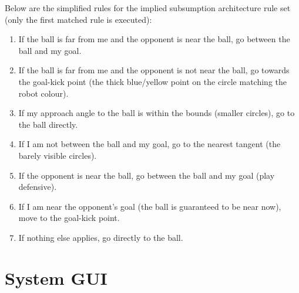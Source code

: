 \documentclass[12pt,a4paper,notitlepage,twocolumn]{report}
\begin{document}
Below are the simplified rules for the implied subsumption
architecture rule set (only the first matched rule is executed):
\begin{enumerate}
\item If the ball is far from me and the opponent is near the ball, go
  between the ball and my goal.
\item If the ball is far from me and the opponent is not near the
  ball, go towards the goal-kick point (the thick blue/yellow point on
  the circle matching the robot colour).
\item If my approach angle to the ball is within the bounds (smaller
  circles), go to the ball directly.
\item If I am not between the ball and my goal, go to the nearest
  tangent (the barely visible circles).
\item If the opponent is near the ball, go between the ball and my
  goal (play defensive).
\item If I am near the opponent’s goal (the ball is guaranteed to be
  near now), move to the goal-kick point.
\item If nothing else applies, go directly to the ball.
\end{enumerate}

\section*{System GUI}
\end{document}
